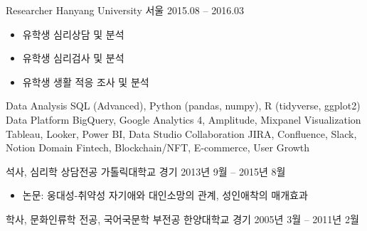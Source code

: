 \documentclass[11pt, a4paper]{awesome-cv}
\begin{document}
\begin{cventries}
  \cventry
    {Researcher}
    {Hanyang University}
    {서울}
    {2015.08 -- 2016.03}
    {
      \begin{itemize}
        \item 유학생 심리상담 및 분석
        \item 유학생 심리검사 및 분석
        \item 유학생 생활 적응 조사 및 분석
      \end{itemize}
    }

\end{cventries}


\begin{cvskills}
  \cvskill
    {Data Analysis}
    {SQL (Advanced), Python (pandas, numpy), R (tidyverse, ggplot2)}
  \cvskill
    {Data Platform}
    {BigQuery, Google Analytics 4, Amplitude, Mixpanel}
  \cvskill
    {Visualization}
    {Tableau, Looker, Power BI, Data Studio}
  \cvskill
    {Collaboration}
    {JIRA, Confluence, Slack, Notion}
  \cvskill
    {Domain}
    {Fintech, Blockchain/NFT, E-commerce, User Growth}
\end{cvskills}


\begin{cventries}
  \cventry
    {석사, 심리학 상담전공}
    {가톨릭대학교}
    {경기}
    {2013년 9월 -- 2015년 8월}
    {
      \begin{itemize}
        \item 논문: 웅대성-취약성 자기애와 대인소망의 관계, 성인애착의 매개효과
      \end{itemize}
    }

  \cventry
    {학사, 문화인류학 전공, 국어국문학 부전공}
    {한양대학교}
    {경기}
    {2005년 3월 -- 2011년 2월}
    {}
\end{cventries}

\end{document}
